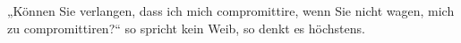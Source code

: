 „Können Sie verlangen, dass ich mich compromittire, wenn Sie nicht wagen, mich zu compromittiren?“ so spricht kein Weib, so denkt es höchstens.
\par

